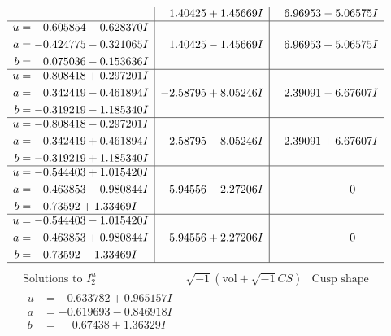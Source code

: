 \documentclass[1p]{elsarticle_modified}
\theoremstyle{definition}
\newcommand{\I}{\sqrt{-1}}
\begin{document}
$$\begin{array}{c|c|c}
 & \phantom{-}1.40425 + 1.45669 I & \phantom{-}6.96953 - 5.06575 I \\ \hline\begin{aligned}
u &= \phantom{-}0.605854 - 0.628370 I \\
a &= -0.424775 - 0.321065 I \\
b &= \phantom{-}0.075036 - 0.153636 I\end{aligned}
 & \phantom{-}1.40425 - 1.45669 I & \phantom{-}6.96953 + 5.06575 I \\ \hline\begin{aligned}
u &= -0.808418 + 0.297201 I \\
a &= \phantom{-}0.342419 - 0.461894 I \\
b &= -0.319219 - 1.185340 I\end{aligned}
 & -2.58795 + 8.05246 I & \phantom{-}2.39091 - 6.67607 I \\ \hline\begin{aligned}
u &= -0.808418 - 0.297201 I \\
a &= \phantom{-}0.342419 + 0.461894 I \\
b &= -0.319219 + 1.185340 I\end{aligned}
 & -2.58795 - 8.05246 I & \phantom{-}2.39091 + 6.67607 I \\ \hline\begin{aligned}
u &= -0.544403 + 1.015420 I \\
a &= -0.463853 - 0.980844 I \\
b &= \phantom{-}0.73592 + 1.33469 I\end{aligned}
 & \phantom{-}5.94556 - 2.27206 I & \phantom{-0.000000 } 0 \\ \hline\begin{aligned}
u &= -0.544403 - 1.015420 I \\
a &= -0.463853 + 0.980844 I \\
b &= \phantom{-}0.73592 - 1.33469 I\end{aligned}
 & \phantom{-}5.94556 + 2.27206 I & \phantom{-0.000000 } 0\\
 \hline 
 \end{array}$$\newpage$$\begin{array}{c|c|c}  
\text{Solutions to }I^u_{2}& \I (\text{vol} + \sqrt{-1}CS) & \text{Cusp shape}\\
 \hline 
\begin{aligned}
u &= -0.633782 + 0.965157 I \\
a &= -0.619693 - 0.846918 I \\
b &= \phantom{-}0.67438 + 1.36329 I\end{aligned}

\end{array}$$
\end{document}
